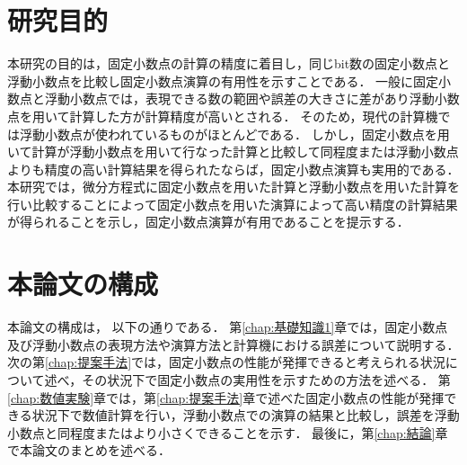 \section{研究目的}
本研究の目的は，固定小数点の計算の精度に着目し，同じbit数の固定小数点と浮動小数点を比較し固定小数点演算の有用性を示すことである．
一般に固定小数点と浮動小数点では，表現できる数の範囲や誤差の大きさに差があり浮動小数点を用いて計算した方が計算精度が高いとされる．
そのため，現代の計算機では浮動小数点が使われているものがほとんどである．
しかし，固定小数点を用いて計算が浮動小数点を用いて行なった計算と比較して同程度または浮動小数点よりも精度の高い計算結果を得られたならば，固定小数点演算も実用的である．
本研究では，微分方程式に固定小数点を用いた計算と浮動小数点を用いた計算を行い比較することによって固定小数点を用いた演算によって高い精度の計算結果が得られることを示し，固定小数点演算が有用であることを提示する．

\section{本論文の構成}
本論文の構成は， 以下の通りである．
第\ref{chap:基礎知識1}章では，固定小数点及び浮動小数点の表現方法や演算方法と計算機における誤差について説明する．
次の第\ref{chap:提案手法}では，固定小数点の性能が発揮できると考えられる状況について述べ，その状況下で固定小数点の実用性を示すための方法を述べる．
第\ref{chap:数値実験}章では，第\ref{chap:提案手法}章で述べた固定小数点の性能が発揮できる状況下で数値計算を行い，浮動小数点での演算の結果と比較し，誤差を浮動小数点と同程度またはより小さくできることを示す．
最後に，第\ref{chap:結論}章で本論文のまとめを述べる．

